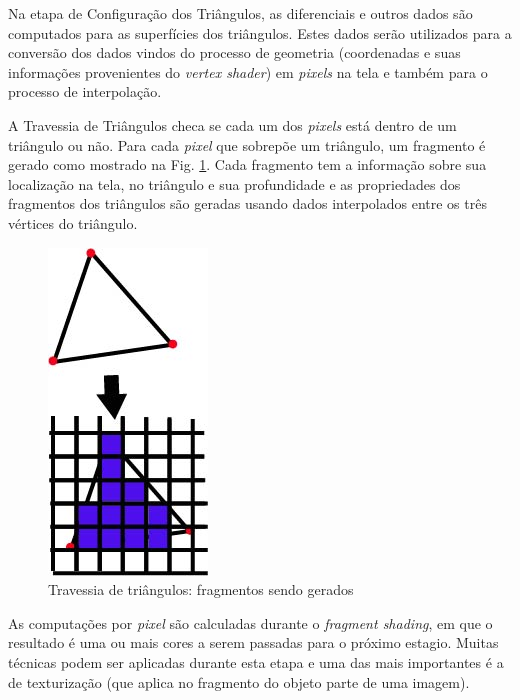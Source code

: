 	Na etapa de Configuração dos Triângulos, as diferenciais e outros dados são computados para as superfícies dos triângulos. Estes dados serão utilizados para a conversão dos dados vindos do processo de geometria (coordenadas e suas informações provenientes do \textit{vertex shader}) em \textit{pixels} na tela e também para o processo de interpolação. 

	A Travessia de Triângulos checa se cada um dos \textit{pixels} está dentro de um triângulo ou não. Para cada \textit{pixel} que sobrepõe um triângulo, um fragmento é gerado como mostrado na Fig. \ref{traversal}. Cada fragmento tem a informação sobre sua localização na tela, no triângulo e sua profundidade e as propriedades dos fragmentos dos triângulos são geradas usando dados interpolados entre os três vértices do triângulo. 

  \begin{figure}[h]
       \centering
	\includegraphics[keepaspectratio=true,scale=0.8]{figuras/traversal.jpg}
       \caption{Travessia de triângulos: fragmentos sendo gerados}
       \label{traversal}
       \end{figure}

	As computações por \textit{pixel} são calculadas durante o \textit{fragment shading}, em que o resultado é uma ou mais cores a serem passadas para o próximo estagio. Muitas técnicas podem ser aplicadas durante esta etapa e uma das mais importantes é a de texturização (que aplica no fragmento do objeto parte de uma imagem). 

